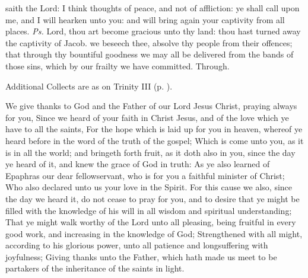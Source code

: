 
\introit
{} saith the Lord: I think thoughts of peace, and not of affliction: ye shall call upon me, and I will hearken unto you: and will bring again your captivity from all places. \textit{Ps.} Lord, thou art become gracious unto thy land: thou hast turned away the captivity of Jacob.
\collect
{} we beseech thee, absolve thy people from their offences; that through thy bountiful goodness we may all be delivered from the bands of those sins, which by our frailty we have committed. Through.
\begin{rubric}
    Additional Collects are as on Trinity III (p. \pageref{TrinityIII}).
\end{rubric}

 We give thanks to God and the Father of our Lord Jesus Christ, praying always for you, Since we heard of your faith in Christ Jesus, and of the love which ye have to all the saints, For the hope which is laid up for you in heaven, whereof ye heard before in the word of the truth of the gospel; Which is come unto you, as it is in all the world; and bringeth forth fruit, as it doth also in you, since the day ye heard of it, and knew the grace of God in truth: As ye also learned of Epaphras our dear fellowservant, who is for you a faithful minister of Christ; Who also declared unto us your love in the Spirit. For this cause we also, since the day we heard it, do not cease to pray for you, and to desire that ye might be filled with the knowledge of his will in all wisdom and spiritual understanding; That ye might walk worthy of the Lord unto all pleasing, being fruitful in every good work, and increasing in the knowledge of God; Strengthened with all might, according to his glorious power, unto all patience and longsuffering with joyfulness; Giving thanks unto the Father, which hath made us meet to be partakers of the inheritance of the saints in light.


